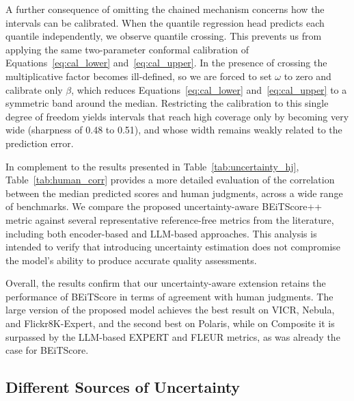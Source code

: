 \documentclass[11pt]{article}
\begin{document}
A further consequence of omitting the chained mechanism concerns how the
intervals can be calibrated. When the quantile regression head predicts each quantile independently, we observe quantile crossing. This prevents
us from applying the same two-parameter conformal calibration of
Equations~\ref{eq:cal_lower} and~\ref{eq:cal_upper}. In
the presence of crossing the multiplicative factor becomes ill-defined, so we are forced to set $\omega$ to zero and calibrate only $\beta$, which reduces Equations~\ref{eq:cal_lower} and~\ref{eq:cal_upper} to a symmetric band around the median. Restricting the calibration to this single degree of freedom yields intervals that reach high coverage only by becoming very wide (sharpness of 0.48 to 0.51), and whose width remains weakly related to the prediction error.



In complement to the results presented in Table~\ref{tab:uncertainty_hj}, Table~\ref{tab:human_corr} provides a more detailed evaluation of the correlation between the median predicted scores and human judgments, across a wide range of benchmarks. We compare the proposed uncertainty-aware BEiTScore++ metric against several representative reference-free metrics from the literature, including both encoder-based and LLM-based approaches. This analysis is intended to verify that introducing uncertainty estimation does not compromise the model’s ability to produce accurate quality assessments.

Overall, the results confirm that our uncertainty-aware extension retains the performance of BEiTScore in terms of agreement with human judgments. The large version of the proposed model achieves the best result on VICR, Nebula, and Flickr8K-Expert, and the second best on Polaris, while on Composite it is surpassed by the LLM-based EXPERT and FLEUR metrics, as was already the case for BEiTScore.


\vspace{-0.13cm}
\subsection{Different Sources of Uncertainty} 
\vspace{-0.13cm}
\label{sec:different_sources_of_uncertainty}
\end{document}
